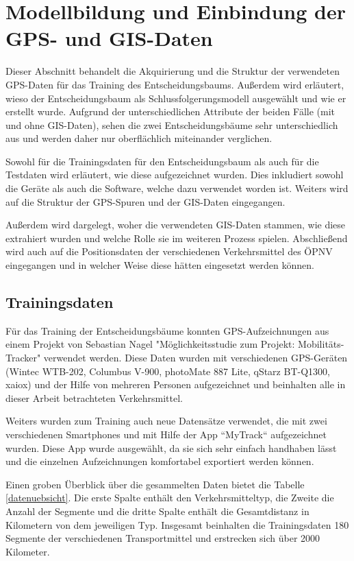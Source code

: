 \chapter{Modellbildung und Einbindung der \\GPS- und GIS-Daten}
Dieser Abschnitt behandelt die Akquirierung und die Struktur der verwendeten GPS-Daten für das Training des Entscheidungsbaums. Außerdem wird erläutert, wieso der Entscheidungsbaum als Schlussfolgerungsmodell ausgewählt und wie er erstellt wurde. Aufgrund der unterschiedlichen Attribute  der beiden Fälle (mit und ohne GIS-Daten), sehen die zwei Entscheidungsbäume sehr unterschiedlich aus und werden daher nur oberflächlich miteinander verglichen.

Sowohl für die Trainingsdaten für den Entscheidungsbaum als auch für die Testdaten wird erläutert, wie diese aufgezeichnet wurden. Dies inkludiert sowohl die Geräte als auch die Software, welche dazu verwendet worden ist. Weiters wird auf die Struktur der GPS-Spuren und der GIS-Daten eingegangen.

Außerdem wird dargelegt, woher die verwendeten GIS-Daten stammen, wie diese extrahiert wurden und welche Rolle sie im weiteren Prozess spielen. Abschließend wird auch auf die Positionsdaten der verschiedenen Verkehrsmittel des ÖPNV eingegangen und in welcher Weise diese hätten eingesetzt werden können.
\clearpage

\section{Trainingsdaten}
\label{sec:trainingdata}
Für das Training der Entscheidungsbäume konnten GPS-Aufzeichnungen aus einem Projekt von Sebastian Nagel "Möglichkeitsstudie zum Projekt: Mobilitäts-Tracker" verwendet werden. Diese Daten wurden mit verschiedenen GPS-Geräten (Wintec WTB-202, Columbus V-900, photoMate 887 Lite, qStarz BT-Q1300, xaiox) und der Hilfe von mehreren Personen aufgezeichnet und beinhalten alle in dieser Arbeit betrachteten Verkehrsmittel. \cite{sebastian_nagel_moglichkeitsstudie_2011}

Weiters wurden zum Training auch neue Datensätze verwendet, die mit zwei verschiedenen Smartphones und mit Hilfe der App ``MyTrack`` aufgezeichnet wurden. Diese App wurde ausgewählt, da sie sich sehr einfach handhaben lässt und die einzelnen Aufzeichnungen komfortabel exportiert werden können. 

Einen groben Überblick über die gesammelten Daten bietet die Tabelle \ref{datenuebsicht}. Die erste Spalte enthält den Verkehrsmitteltyp, die Zweite die Anzahl der Segmente  und die dritte Spalte enthält die Gesamtdistanz in Kilometern von dem jeweiligen Typ. Insgesamt beinhalten die Trainingsdaten 180 Segmente der verschiedenen Transportmittel und erstrecken sich über 2000 Kilometer.

